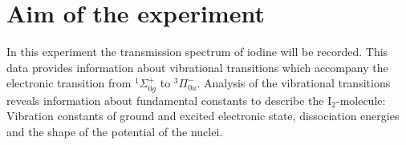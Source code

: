 \section{Aim of the experiment}
In this experiment the transmission spectrum of iodine will be recorded.
This data provides information about vibrational transitions which accompany the electronic transition from
${}^{1}\Sigma_{0g}^+$ to ${}^3 \Pi_{0u}^-$.
Analysis of the vibrational transitions reveals information about fundamental constants
to describe the I$_2$-molecule:
Vibration constants of ground and excited electronic state, dissociation energies and the shape
of the potential of the nuclei.